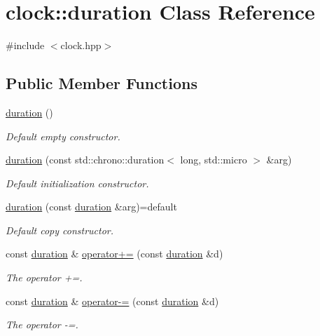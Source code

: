 \hypertarget{classclock_1_1duration}{}\section{clock\+:\+:duration Class Reference}
\label{classclock_1_1duration}


{\ttfamily \#include $<$clock.\+hpp$>$}

\subsection*{Public Member Functions}
\begin{DoxyCompactItemize}
\item 
\hyperlink{classclock_1_1duration_a3611f956ffd8d1c375241423de51bc95}{duration} ()
\begin{DoxyCompactList}\small\item\em Default empty constructor. \end{DoxyCompactList}\item 
\hyperlink{classclock_1_1duration_a1aec1621a5e0cd049abcfea1a09ffcb2}{duration} (const std\+::chrono\+::duration$<$ long, std\+::micro $>$ \&arg)
\begin{DoxyCompactList}\small\item\em Default initialization constructor. \end{DoxyCompactList}\item 
\hyperlink{classclock_1_1duration_a9adbb609a370dd1b7f1193fab49586d4}{duration} (const \hyperlink{classclock_1_1duration}{duration} \&arg)=default
\begin{DoxyCompactList}\small\item\em Default copy constructor. \end{DoxyCompactList}\item 
const \hyperlink{classclock_1_1duration}{duration} \& \hyperlink{classclock_1_1duration_a0e236ce45bad58ab8d1adc78ecd13aa5}{operator+=} (const \hyperlink{classclock_1_1duration}{duration} \&d)
\begin{DoxyCompactList}\small\item\em The operator +=. \end{DoxyCompactList}\item 
const \hyperlink{classclock_1_1duration}{duration} \& \hyperlink{classclock_1_1duration_acda5c496694591cbb1473e5ed9912581}{operator-\/=} (const \hyperlink{classclock_1_1duration}{duration} \&d)
\begin{DoxyCompactList}\small\item\em The operator -\/=. \end{DoxyCompactList}\item 

\end{DoxyCompactItemize}

